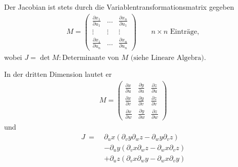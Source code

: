 Der Jacobian ist stets durch die Variablentransformationsmatrix gegeben
\begin{align*}
M = \begin{pmatrix} \frac{\partial x_1}{\partial u_1} & \ldots & \frac{\partial
x_n}{\partial u_1} \\ \vdots & \vdots & \vdots \\ \frac{\partial x_1}{\partial
u_n} & \ldots & \frac{\partial x_n}{\partial u_n} \end{pmatrix} \qquad n\times
n\text{ Einträge},
\end{align*}
wobei $J = \operatorname{det}M : \text{Determinante von $M$ (siehe Lineare
Algebra)}$.
\par
In der dritten Dimension lautet er
\begin{align*}
M = \begin{pmatrix} \frac{\partial x}{\partial u} & \frac{\partial y}{\partial u} & \frac{\partial z}{\partial u}\\
\frac{\partial x}{\partial v} & \frac{\partial y}{\partial v} & \frac{\partial z}{\partial v}\\
\frac{\partial x}{\partial w} & \frac{\partial y}{\partial w} & \frac{\partial z}{\partial w}\end{pmatrix}
\end{align*}
und
\begin{align*}
J\ =\; &\partial_ux(\partial_vy\partial_wz-\partial_wy\partial_vz) \\
&- \partial_uy(\partial_vx\partial_wz - \partial_wx\partial_vz) \\
&+\partial_uz(\partial_vx\partial_wy-\partial_wx\partial_vy)
\end{align*}

